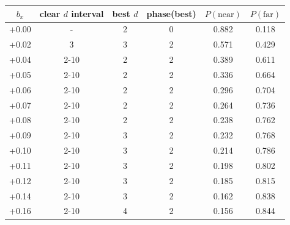 \begin{tabular}{@{}cccccc@{}}
\toprule
$b_x$ & clear $d$ interval & best $d$ & phase(best) & $P(\mathrm{near})$ & $P(\mathrm{far})$ \\
\midrule
+0.00 & - & 2 & 0 & 0.882 & 0.118 \\
+0.02 & 3 & 3 & 2 & 0.571 & 0.429 \\
+0.04 & 2-10 & 2 & 2 & 0.389 & 0.611 \\
+0.05 & 2-10 & 2 & 2 & 0.336 & 0.664 \\
+0.06 & 2-10 & 2 & 2 & 0.296 & 0.704 \\
+0.07 & 2-10 & 2 & 2 & 0.264 & 0.736 \\
+0.08 & 2-10 & 2 & 2 & 0.238 & 0.762 \\
+0.09 & 2-10 & 3 & 2 & 0.232 & 0.768 \\
+0.10 & 2-10 & 3 & 2 & 0.214 & 0.786 \\
+0.11 & 2-10 & 3 & 2 & 0.198 & 0.802 \\
+0.12 & 2-10 & 3 & 2 & 0.185 & 0.815 \\
+0.14 & 2-10 & 3 & 2 & 0.162 & 0.838 \\
+0.16 & 2-10 & 4 & 2 & 0.156 & 0.844 \\
\bottomrule
\end{tabular}
